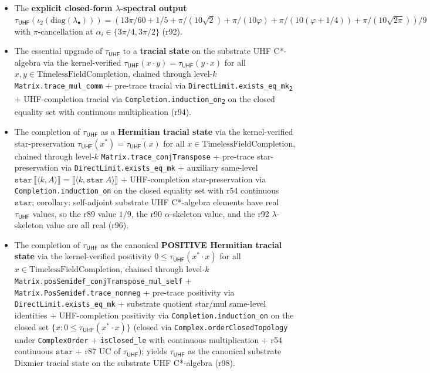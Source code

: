 \documentclass[11pt,a4paper]{amsart}
\theoremstyle{plain}
\theoremstyle{definition}
\begin{document}
\begin{itemize}[itemsep=2pt,leftmargin=2em]
\item The \textbf{explicit closed-form $\lambda$-spectral output} $\tau_{\textsf{UHF}}(\iota_2(\mathrm{diag}(\lambda_\bullet))) = (13\pi/60 + 1/5 + \pi/(10\sqrt{2}) + \pi/(10\varphi) + \pi/(10(\varphi + 1/4)) + \pi/(10\sqrt{2\pi}))/9$ with $\pi$-cancellation at $\alpha_i \in \{3\pi/4, 3\pi/2\}$ (r92).
\item The essential upgrade of $\tau_{\textsf{UHF}}$ to a \textbf{tracial state} on the substrate UHF C*-algebra via the kernel-verified $\tau_{\textsf{UHF}}(x \cdot y) = \tau_{\textsf{UHF}}(y \cdot x)$ for all $x, y \in \mathrm{TimelessFieldCompletion}$, chained through level-$k$ \texttt{Matrix.trace\_mul\_comm} $+$ pre-trace tracial via \texttt{DirectLimit.exists\_eq\_mk\textsubscript{2}} $+$ UHF-completion tracial via \texttt{Completion.induction\_on\textsubscript{2}} on the closed equality set with continuous multiplication (r94).
\item The completion of $\tau_{\textsf{UHF}}$ as a \textbf{Hermitian tracial state} via the kernel-verified star-preservation $\tau_{\textsf{UHF}}(x^*) = \overline{\tau_{\textsf{UHF}}(x)}$ for all $x \in \mathrm{TimelessFieldCompletion}$, chained through level-$k$ \texttt{Matrix.trace\_conjTranspose} $+$ pre-trace star-preservation via \texttt{DirectLimit.exists\_eq\_mk} + auxiliary same-level $\mathtt{star}~\llbracket \langle k, A \rangle \rrbracket = \llbracket \langle k, \mathtt{star}~A \rangle \rrbracket$ + UHF-completion star-preservation via \texttt{Completion.induction\_on} on the closed equality set with r54 continuous $\mathtt{star}$; corollary: self-adjoint substrate UHF C*-algebra elements have real $\tau_{\textsf{UHF}}$ values, so the r89 value $1/9$, the r90 $\alpha$-skeleton value, and the r92 $\lambda$-skeleton value are all real (r96).
\item The completion of $\tau_{\textsf{UHF}}$ as the canonical \textbf{POSITIVE Hermitian tracial state} via the kernel-verified positivity $0 \le \tau_{\textsf{UHF}}(x^* \cdot x)$ for all $x \in \mathrm{TimelessFieldCompletion}$, chained through level-$k$ \texttt{Matrix.posSemidef\_conjTranspose\_mul\_self} $+$ \texttt{Matrix.PosSemidef.trace\_nonneg} $+$ pre-trace positivity via \texttt{DirectLimit.exists\_eq\_mk} + substrate quotient star/mul same-level identities + UHF-completion positivity via \texttt{Completion.induction\_on} on the closed set $\{x : 0 \le \tau_{\textsf{UHF}}(x^* \cdot x)\}$ (closed via \texttt{Complex.orderClosedTopology} under \texttt{ComplexOrder} + \texttt{isClosed\_le} with continuous multiplication + r54 continuous $\mathtt{star}$ + r87 UC of $\tau_{\textsf{UHF}}$); yields $\tau_{\textsf{UHF}}$ as the canonical substrate Dixmier tracial state on the substrate UHF C*-algebra (r98).
\end{itemize}
\end{document}

